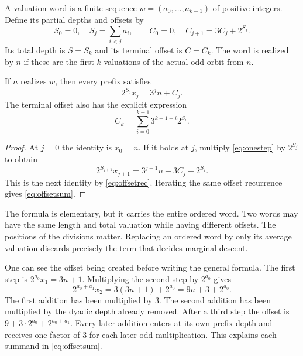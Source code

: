 \begin{definition}\label{def:word}
A valuation word is a finite sequence $w=(a_0,\ldots,a_{k-1})$ of positive integers. Define its partial depths and offsets by
\begin{equation}\label{eq:offsetrec}
S_0=0,\quad S_j=\sum_{i<j}a_i,\qquad
C_0=0,\quad C_{j+1}=3C_j+2^{S_j}.
\end{equation}
Its total depth is $S=S_k$ and its terminal offset is $C=C_k$. The word is realized by $n$ if these are the first $k$ valuations of the actual odd orbit from $n$.
\end{definition}

\begin{theorem}\label{thm:affine}
If $n$ realizes $w$, then every prefix satisfies
\begin{equation}\label{eq:affine}
2^{S_j}x_j=3^j n+C_j.
\end{equation}
The terminal offset also has the explicit expression
\begin{equation}\label{eq:offsetsum}
C_k=\sum_{i=0}^{k-1}3^{k-1-i}2^{S_i}.
\end{equation}
\end{theorem}
\begin{proof}
At $j=0$ the identity is $x_0=n$. If it holds at $j$, multiply \eqref{eq:onestep} by $2^{S_j}$ to obtain
\[
2^{S_{j+1}}x_{j+1}=3^{j+1}n+3C_j+2^{S_j}.
\]
This is the next identity by \eqref{eq:offsetrec}. Iterating the same offset recurrence gives \eqref{eq:offsetsum}.
\end{proof}

The formula is elementary, but it carries the entire ordered word. Two words may have the same length and total valuation while having different offsets. The positions of the divisions matter. Replacing an ordered word by only its average valuation discards precisely the term that decides marginal descent.

One can see the offset being created before writing the general formula. The first step is $2^{a_0}x_1=3n+1$. Multiplying the second step by $2^{a_0}$ gives
\[
2^{a_0+a_1}x_2=3(3n+1)+2^{a_0}
=9n+3+2^{a_0}.
\]
The first addition has been multiplied by 3. The second addition has been multiplied by the dyadic depth already removed. After a third step the offset is $9+3\cdot2^{a_0}+2^{a_0+a_1}$. Every later addition enters at its own prefix depth and receives one factor of 3 for each later odd multiplication. This explains each summand in \eqref{eq:offsetsum}.

